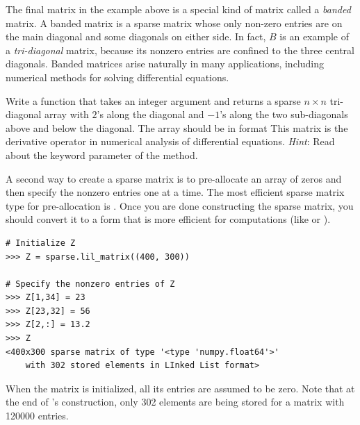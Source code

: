 The final matrix  in the example above is a special kind of matrix called a \emph{banded} matrix. A banded matrix is a sparse matrix whose only non-zero entries are on the main diagonal and some diagonals on either side. In fact, $B$ is an example of a \emph{tri-diagonal} matrix, because its nonzero entries are confined to the three central diagonals. Banded matrices arise naturally in many applications, including numerical methods for solving differential equations. 

\begin{problem}
Write a function that takes an integer argument  and returns a sparse $n\times n$
tri-diagonal array with $2$'s along the diagonal and $-1$'s along
the two sub-diagonals above and below the diagonal. The array should be in  format
This matrix is the derivative operator in numerical analysis of differential equations.
\emph{Hint}: Read about the  keyword parameter of the  method.
\label{prob:sparse_tridiag}
\end{problem}

A second way to create a sparse matrix is to pre-allocate an array of zeros and then specify the nonzero entries one at a time. The most efficient sparse matrix type for pre-allocation is . Once you are done constructing the sparse matrix, you should convert it to a form that is more efficient for computations (like  or ).


\begin{lstlisting}
# Initialize Z
>>> Z = sparse.lil_matrix((400, 300))

# Specify the nonzero entries of Z
>>> Z[1,34] = 23
>>> Z[23,32] = 56
>>> Z[2,:] = 13.2
>>> Z
<400x300 sparse matrix of type '<type 'numpy.float64'>'
	with 302 stored elements in LInked List format>

\end{lstlisting}

When the matrix  is initialized, all its entries are assumed to be zero. 
Note that at the end of 's construction, only 302 elements are being stored for a matrix with 120000 entries. 

